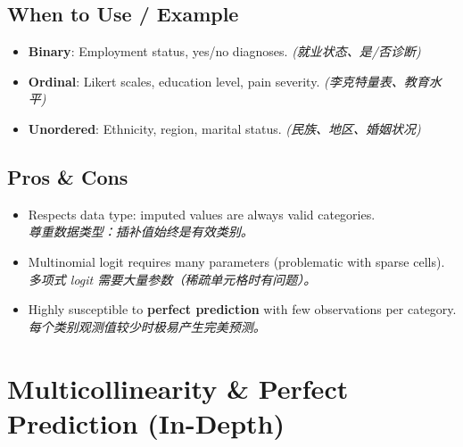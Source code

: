 \documentclass[9pt, a4paper]{article}
\begin{document}
\subsection{When to Use / Example}
\begin{itemize}
    \item \textbf{Binary}: Employment status, yes/no diagnoses. \textit{(就业状态、是/否诊断)}
    \item \textbf{Ordinal}: Likert scales, education level, pain severity. \textit{(李克特量表、教育水平)}
    \item \textbf{Unordered}: Ethnicity, region, marital status. \textit{(民族、地区、婚姻状况)}
\end{itemize}

\subsection{Pros \& Cons}
\begin{tcolorbox}[prosbox]
    \begin{itemize}
        \item [\ding{51}] Respects data type: imputed values are always valid categories.\\
        \textit{尊重数据类型：插补值始终是有效类别。}
    \end{itemize}
\end{tcolorbox}
\begin{tcolorbox}[consbox]
    \begin{itemize}
        \item [\ding{55}] Multinomial logit requires many parameters (problematic with sparse cells).\\
        \textit{多项式 logit 需要大量参数（稀疏单元格时有问题）。}
        \item [\ding{55}] Highly susceptible to \textbf{perfect prediction} with few observations per category.\\
        \textit{每个类别观测值较少时极易产生完美预测。}
    \end{itemize}
\end{tcolorbox}

\section{Multicollinearity \& Perfect Prediction (In-Depth)}
\end{document}

